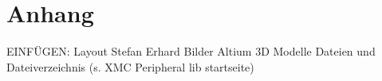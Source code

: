 \chapter{Anhang}
\label{sec:Anhang}
\pagestyle{scrheadings}
EINFÜGEN:
Layout Stefan Erhard
Bilder Altium
3D Modelle
Dateien und Dateiverzeichnis (s. XMC Peripheral lib startseite)

















